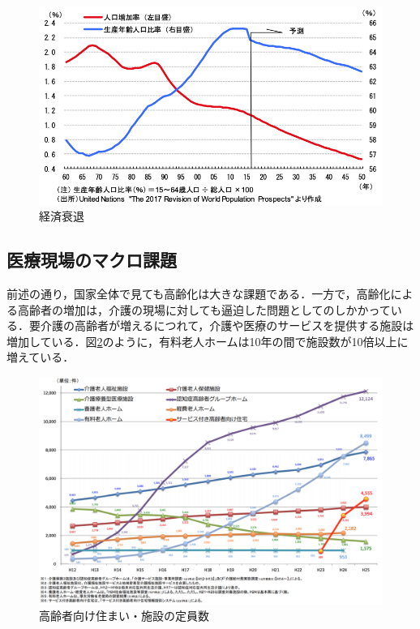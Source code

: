 \begin{figure}[htb]
 \begin{center}
 \includegraphics[scale=0.6]{figures/population_GDP_relation}
 \caption[経済衰退]{経済衰退 \label{population_GDP_relation}}
 \end{center}
\end{figure}

\subsection{医療現場のマクロ課題}

前述の通り，国家全体で見ても高齢化は大きな課題である．一方で，高齢化による高齢者の増加は，介護の現場に対しても逼迫した問題としてのしかかっている．要介護の高齢者が増えるにつれて，介護や医療のサービスを提供する施設は増加している．図\ref{nurse_facility_increase}のように，有料老人ホームは10年の間で施設数が10倍以上に増えている．

\begin{figure}[htb]
 \begin{center}
 \includegraphics[scale=0.4]{figures/nurse_facility_increase}
 \caption[高齢者向け住まい・施設の定員数]{高齢者向け住まい・施設の定員数 \label{nurse_facility_increase}}
 \end{center}
\end{figure}

